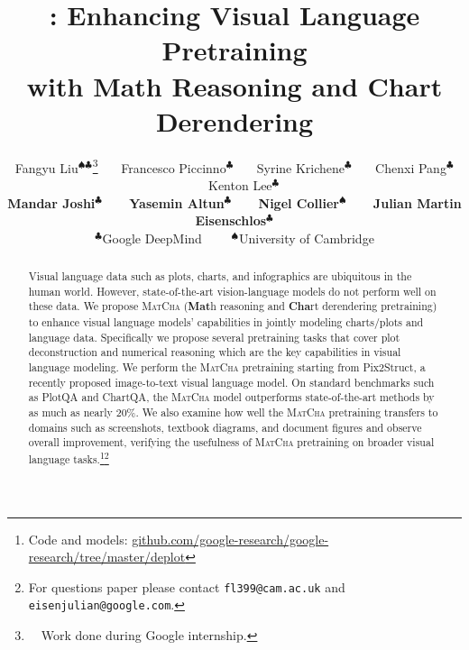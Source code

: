 \documentclass[11pt]{article}
\title{\model{} : Enhancing Visual Language Pretraining \\with Math Reasoning and Chart Derendering}
\author{Fangyu Liu$^{\spadesuit\clubsuit}$\thanks{\ \ Work done during Google internship.} \ \ \ Francesco Piccinno$^\clubsuit$ \ \ \ Syrine Krichene$^\clubsuit$ \ \ \ Chenxi Pang$^\clubsuit$ \ \ \ Kenton Lee$^\clubsuit$ \\ \textbf{Mandar Joshi$^\clubsuit$ \ \ \ Yasemin Altun$^\clubsuit$ \ \ \ Nigel Collier$^\spadesuit$ \ \ \ Julian Martin Eisenschlos$^\clubsuit$} \\
$^\clubsuit$Google DeepMind \ \ \ \ $^\spadesuit$University of Cambridge}
\newcommand{\model}{\textsc{MatCha}}
\begin{document}
\maketitle


\begin{abstract}
Visual language data such as plots, charts, and infographics are ubiquitous in the human world. However, state-of-the-art vision-language models do not perform well on these data.
We propose \model{} (\textbf{Mat}h reasoning and \textbf{Cha}rt derendering pretraining) to enhance visual language models' capabilities in jointly modeling charts/plots and language data. Specifically we propose several pretraining tasks that cover plot deconstruction and numerical reasoning which are the key capabilities in visual language modeling. 
We perform the \model{} pretraining starting from Pix2Struct, a recently proposed image-to-text visual language model.
On standard benchmarks such as PlotQA and ChartQA, the \model{} model outperforms state-of-the-art methods by as much as nearly 20\%.
We also examine how well the \model{} pretraining transfers to domains such as screenshots, textbook diagrams, and document figures and observe overall improvement, verifying the usefulness of \model{} pretraining on broader visual language tasks.\footnote{Code and models: \href{https://github.com/google-research/google-research/tree/master/deplot}{github.com/google-research/google-research/tree/master/deplot}}\footnote{For questions paper please contact \texttt{fl399@cam.ac.uk} and \texttt{eisenjulian@google.com}.}

\end{abstract}








% 







\end{document}
